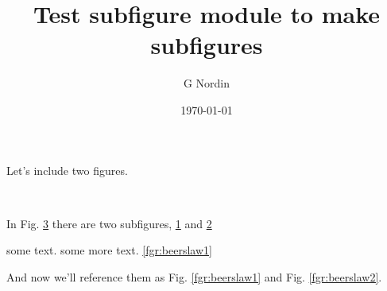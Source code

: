\documentclass[12pt]{article}
\title{Test subfigure module to make subfigures}
\author{G Nordin}
\date{\today}
\begin{document}
\maketitle

\noindent Let's include two figures.

\begin{figure}[ht] \centering
        \begin{subfigure}{\textwidth}
                \centering
                \;
                \;
                \caption{}
                \label{fig:database}
        \end{subfigure}\\[2em]
        \begin{subfigure}[b]{\textwidth}
                \centering
                \caption{}
                \label{fig:partb}
        \end{subfigure}
        \caption{}\label{fig:query}
\end{figure}

In Fig. \ref{fig:query} there are two subfigures, \ref{fig:database} and \ref{fig:partb}

some text. some more text. \ref{fgr:beerslaw1}

\noindent And now we'll reference them as Fig. \ref{fgr:beerslaw1} and Fig. \ref{fgr:beerslaw2}.
\end{document}

